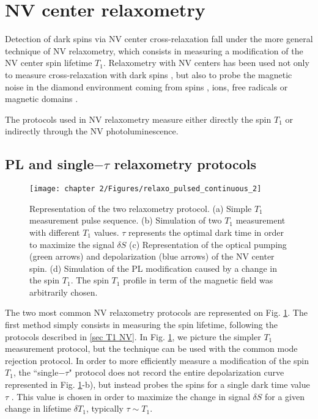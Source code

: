 \documentclass[a4paper, 11pt]{report}
\begin{document}
\section{NV center relaxometry}

Detection of dark spins via NV center cross-relaxation fall under the more general technique of NV relaxometry, which consists in measuring a modification of the NV center spin lifetime $T_1$. Relaxometry with NV centers has been used not only to measure cross-relaxation with dark spins \citep{van1989cross, holliday1989optical, epstein2005anisotropic, armstrong2010nv, hall2016detection, wickenbrock2016microwave, wood2016wide, alfasi2019detection, lazda2021cross}, but also to probe the magnetic noise in the diamond environment coming from spins \citep{steinert2013magnetic}, ions\citep{tetienne2013spin}, free radicals \citep{nie2021quantum}or magnetic domains \citep{finco2021imaging}. 

The protocols used in NV relaxometry measure either directly the spin $T_1$ or indirectly through the NV photoluminescence.

\subsection{PL and single$-\tau$ relaxometry protocols}
\begin{figure}[h]
\centering
\texttt{[image: chapter 2/Figures/relaxo\_pulsed\_continuous\_2]}
\caption{Representation of the two relaxometry protocol. (a) Simple $T_1$ measurement pulse sequence. (b) Simulation of two $T_1$ measurement with different $T_1$ values. $\tau$ represents the optimal dark time in order to maximize the signal $\delta S$ (c) Representation of the optical pumping (green arrows) and depolarization (blue arrows) of the NV center spin. (d) Simulation of the PL modification caused by a change in the spin $T_1$. The spin $T_1$ profile in term of the magnetic field was arbitrarily chosen.}
\label{T1 vs PL}
\end{figure}

The two most common NV relaxometry protocols are represented on Fig. \ref{T1 vs PL}. The first method simply consists in measuring the spin lifetime, following the protocols described in \ref{sec T1 NV}. In Fig. \ref{T1 vs PL}, we picture the simpler $T_1$ measurement protocol, but the technique can be used with the common mode rejection protocol. In order to more efficiently measure a modification of the spin $T_1$, the ``single$-\tau$" protocol does not record the entire depolarization curve represented in Fig. \ref{T1 vs PL}-b), but instead probes the spins for a single dark time value $\tau$ \citep{pelliccione2014two, schmid2015relaxometry, tetienne2016scanning}. This value is chosen in order to maximize the change in signal $\delta S$ for a given change in lifetime $\delta T_1$, typically $\tau \sim T_1$.
\end{document}
